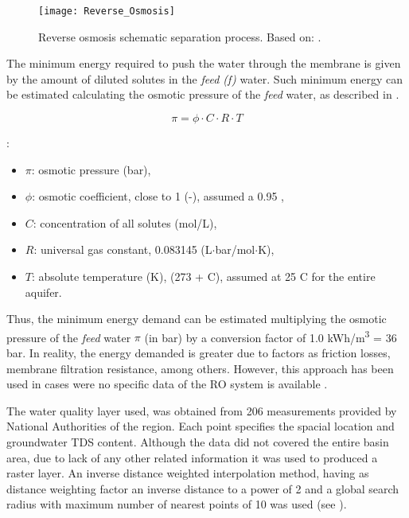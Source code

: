 \begin{figure}[!ht]
	\centering
	\texttt{[image: Reverse\_Osmosis]}
	\caption[Reverse Osmosis schematic separation process]{Reverse osmosis schematic separation process. Based on: \cite{crittenden_mwhs_2012}.}
	\label{fig:ro}
\end{figure} 

The minimum energy required to push the water through the membrane is given by the amount of diluted solutes in the \textit{feed (f)} water. Such minimum energy can be estimated calculating the osmotic pressure of the \textit{feed} water, as described in  \cite{crittenden_mwhs_2012}.

\begin{equation}\label{eq:6}
\pi = \phi\cdot C\cdot R\cdot T
\end{equation}

:
\begin{itemize}[label={-}]
	\item $\pi$: osmotic pressure (bar),
	\item $\phi$: osmotic coefficient, close to 1 (-), assumed a 0.95 \cite{crittenden_mwhs_2012},
	\item $C$: concentration of all solutes (mol/L),
	\item $R$: universal gas constant, 0.083145 (L$\cdot$bar/mol$\cdot$K),
	\item $T$: absolute temperature (K), (273 + \degree C), assumed at 25 \degree C for the entire aquifer.
\end{itemize}

Thus, the minimum energy demand can be estimated multiplying the osmotic pressure of the \textit{feed} water $\pi$ (in bar) by a conversion factor of 1.0 kWh/m\textsuperscript{3} = 36 bar. In reality, the energy demanded is greater due to factors as friction losses, membrane filtration resistance, among others. However, this approach has been used in cases were no specific data of the RO system is available \cite{KARABELAS201815}.

The water quality layer used, was obtained from 206 measurements provided by National Authorities of the region. Each point specifies the spacial location and groundwater TDS content. Although the data did not covered the entire basin area, due to lack of any other related information it was used to produced a raster layer. An inverse distance weighted interpolation method, having as distance weighting factor an inverse distance to a power of 2 and a global search radius with maximum number of nearest points of 10 was used (see ).

